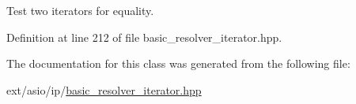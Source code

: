Test two iterators for equality. 



Definition at line 212 of file basic\+\_\+resolver\+\_\+iterator.\+hpp.



The documentation for this class was generated from the following file\+:\begin{DoxyCompactItemize}
\item 
ext/asio/ip/\hyperlink{basic__resolver__iterator_8hpp}{basic\+\_\+resolver\+\_\+iterator.\+hpp}\end{DoxyCompactItemize}
